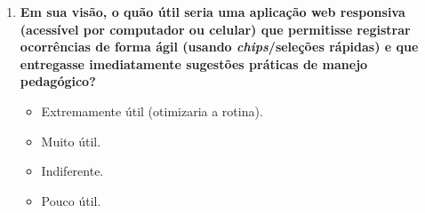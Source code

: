 \begin{apendicesenv}
\begin{enumerate}
    \item \textbf{Em sua visão, o quão útil seria uma aplicação web responsiva (acessível por computador ou celular) que permitisse registrar ocorrências de forma ágil (usando \textit{chips}/seleções rápidas) e que entregasse imediatamente sugestões práticas de manejo pedagógico?}
    \begin{itemize}
        \item[ ] Extremamente útil (otimizaria a rotina).
        \item[ ] Muito útil.
        \item[ ] Indiferente.
        \item[ ] Pouco útil.
    \end{itemize}
\end{enumerate}

\end{apendicesenv}